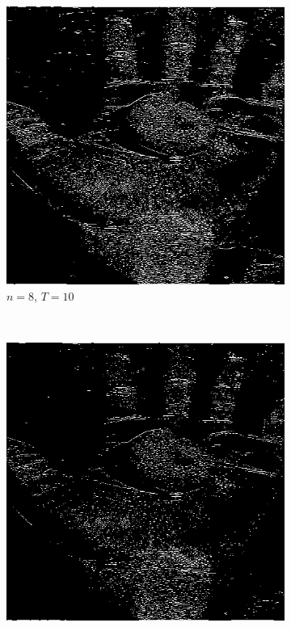 \documentclass{article}
\begin{document}
\begin{enumerate}[label=(\alph*)]
\begin{figure}[!htb]

        \begin{subfigure}[b]{0.3\textwidth}
            \includegraphics[width=\textwidth]{img/ED2_8_10.png}
            \caption{$n = 8$, $T = 10$}
        \end{subfigure}
        ~
        \begin{subfigure}[b]{0.3\textwidth}
            \includegraphics[width=\textwidth]{img/ED2_8_15.png}

\end{subfigure}
\end{figure}
\end{enumerate}
\end{document}
